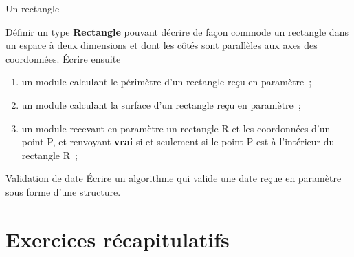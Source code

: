 \begin{Exercice}{Un rectangle}

	Définir un type \textbf{Rectangle} pouvant décrire de façon
	commode un rectangle dans un espace à deux dimensions et dont les côtés
	sont parallèles aux axes des coordonnées. 	
	Écrire ensuite

	\begin{enumerate}[label=\alph*)]
		\item {
			un module calculant le périmètre d’un rectangle reçu en paramètre~;}
		\item {
			un module calculant la surface d’un rectangle reçu en paramètre~;}
		\item {
				un module recevant en paramètre un rectangle R et les coordonnées
				d’un point P, et renvoyant 
				\textbf{vrai} si et seulement si le point P est à
			l’intérieur du rectangle R~;}
	\end{enumerate}
\end{Exercice}

\begin{Exercice}{Validation de date}
	Écrire un algorithme qui valide une date reçue en paramètre 
	sous forme d’une structure.
\end{Exercice}





\section{Exercices récapitulatifs}

